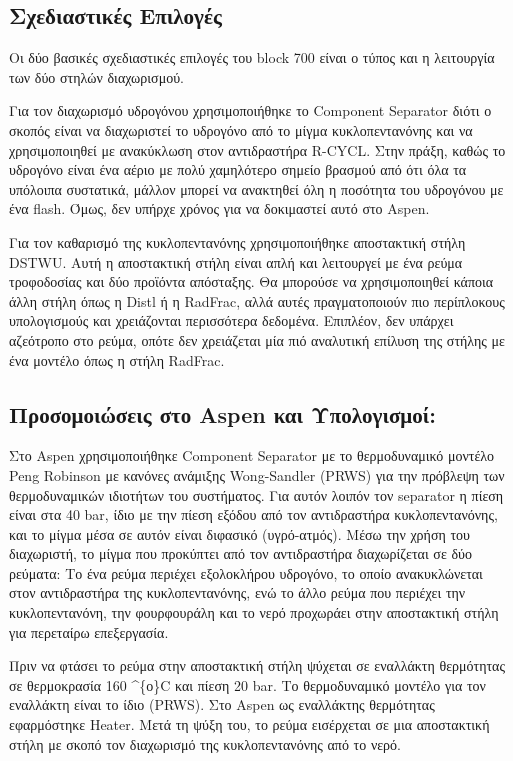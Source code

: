 \documentclass[11pt]{article}
\begin{document}
\subsection{Σχεδιαστικές Επιλογές}
\label{sec:org1de117a}
Οι δύο βασικές σχεδιαστικές επιλογές του block 700 είναι ο τύπος και η
λειτουργία των δύο στηλών διαχωρισμού.

Για τον διαχωρισμό υδρογόνου χρησιμοποιήθηκε το Component Separator
διότι ο σκοπός είναι να διαχωριστεί το υδρογόνο από το μίγμα
κυκλοπεντανόνης και να χρησιμοποιηθεί με ανακύκλωση στον αντιδραστήρα
R-CYCL. Στην πράξη, καθώς το υδρογόνο είναι ένα αέριο με πολύ χαμηλότερο σημείο βρασμού από ότι όλα τα υπόλοιπα συστατικά, μάλλον μπορεί να ανακτηθεί όλη η ποσότητα του υδρογόνου με ένα flash. Όμως, δεν υπήρχε χρόνος για να δοκιμαστεί αυτό στο Aspen.

Για τον καθαρισμό της κυκλοπεντανόνης χρησιμοποιήθηκε αποστακτική στήλη
DSTWU. Αυτή η αποστακτική στήλη είναι απλή και λειτουργεί με ένα ρεύμα
τροφοδοσίας και δύο προϊόντα απόσταξης. Θα μπορούσε να χρησιμοποιηθεί
κάποια άλλη στήλη όπως η Distl ή η RadFrac, αλλά αυτές πραγματοποιούν
πιο περίπλοκους υπολογισμούς και χρειάζονται περισσότερα δεδομένα.
Επιπλέον, δεν υπάρχει αζεότροπο στο ρεύμα, οπότε δεν χρειάζεται μία πιό αναλυτική επίλυση της στήλης με ένα μοντέλο όπως η στήλη RadFrac.

\subsection{Προσομοιώσεις στο Aspen και Υπολογισμοί:}
\label{sec:org2d07629}
Στο Aspen χρησιμοποιήθηκε Component Separator με το θερμοδυναμικό
μοντέλο Peng Robinson με κανόνες ανάμιξης Wong-Sandler (PRWS) για την
πρόβλεψη των θερμοδυναμικών ιδιοτήτων του συστήματος. Για αυτόν λοιπόν
τον separator η πίεση είναι στα 40 bar, ίδιο με την πίεση εξόδου από τον
αντιδραστήρα κυκλοπεντανόνης, και το μίγμα μέσα σε αυτόν είναι διφασικό
(υγρό-ατμός). Μέσω την χρήση του διαχωριστή, το μίγμα που προκύπτει από
τον αντιδραστήρα διαχωρίζεται σε δύο ρεύματα: Το ένα ρεύμα περιέχει
εξολοκλήρου υδρογόνο, το οποίο ανακυκλώνεται στον αντιδραστήρα της
κυκλοπεντανόνης, ενώ το άλλο ρεύμα που περιέχει την κυκλοπεντανόνη, την
φουρφουράλη και το νερό προχωράει στην αποστακτική στήλη για περεταίρω
επεξεργασία.

Πριν να φτάσει το ρεύμα στην αποστακτική στήλη ψύχεται σε εναλλάκτη
θερμότητας σε θερμοκρασία 160 \^{}\{ο\}C και πίεση 20 bar. Το θερμοδυναμικό
μοντέλο για τον εναλλάκτη είναι το ίδιο (PRWS). Στο Aspen ως
εναλλάκτης θερμότητας εφαρμόστηκε Heater. Μετά τη ψύξη του, το ρεύμα
εισέρχεται σε μια αποστακτική στήλη με σκοπό τον διαχωρισμό της
κυκλοπεντανόνης από το νερό.
\end{document}
